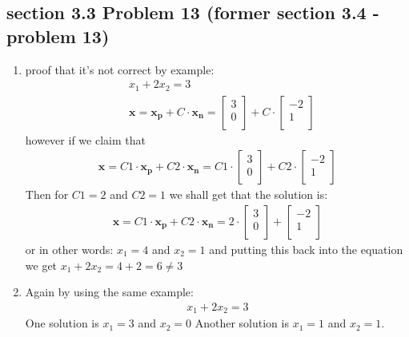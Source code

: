 \documentclass[a4paper,11pt]{article}
\newcommand{\mybf}[1]{\boldsymbol{#1}}
\begin{document}
\subsection*{section 3.3 Problem 13 (former section 3.4 - problem 13)} 
\begin{enumerate}[label=\alph*]
\item proof that it's not correct by example:
\begin{align*}
&x_1+2x_2=3\\
&\mybf{x}=\mybf{x_p}+C \cdot \mybf{x_n}=
\begin{bmatrix}
3 \\
0\\
\end{bmatrix}
+C \cdot
\begin{bmatrix}
-2 \\
1\\
\end{bmatrix}
\end{align*}
however if we claim that 
\begin{align}
\mybf{x}=C1 \cdot \mybf{x_p}+ C2 \cdot \mybf{x_n}=
C1 \cdot
\begin{bmatrix}
3 \\
0\\
\end{bmatrix}
+C2 \cdot
\begin{bmatrix}
-2 \\
1\\
\end{bmatrix}
\end{align}
Then for $C1=2$ and $C2=1$ we shall get that the solution is:
\begin{align}
\mybf{x}=C1 \cdot \mybf{x_p}+ C2 \cdot \mybf{x_n}=
2 \cdot
\begin{bmatrix}
3 \\
0\\
\end{bmatrix}
+
\begin{bmatrix}
-2 \\
 1\\
\end{bmatrix}
\end{align}
or in other words: $x_1=4$ and $x_2=1$ and putting this back into the equation we get $x_1+2x_2=4+2=6 \neq 3$
\item Again by using the same example:
\begin{align}
x_1+2x_2=3
\end{align}
One solution is $x_1=3$ and $x_2=0$
Another solution is $x_1=1$ and $x_2=1$.

\end{enumerate}
\end{document}
